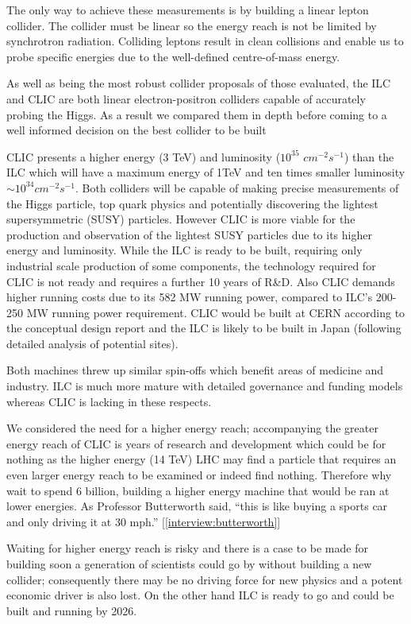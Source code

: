 The only way to achieve these measurements is by building a linear lepton collider. The collider must be linear so the energy reach is not be limited by synchrotron radiation. Colliding leptons result in clean collisions and enable us to probe specific energies due to the well-defined centre-of-mass energy.

As well as being the most robust collider proposals of those evaluated, the ILC and CLIC are both linear electron-positron colliders capable of accurately probing the Higgs. As a result we compared them in depth before coming to a well informed decision on the best collider to be built

CLIC presents a higher energy (3 TeV) and luminosity ($10^{35}$ $cm^{-2} s^{-1}$) than the ILC which will have a maximum energy of 1TeV and ten times smaller luminosity $\sim10^{34} cm^{-2} s^{-1}$. Both colliders will be capable of making precise measurements of the Higgs particle, top quark physics and potentially discovering the lightest supersymmetric (SUSY) particles. However CLIC is more viable for the production and observation of the lightest SUSY particles due to its higher energy and luminosity. While the ILC is ready to be built, requiring only industrial scale production of some components, the technology required for CLIC is not ready and requires a further 10 years of R\&D. Also CLIC demands higher running costs due to its 582 MW running power, compared to ILC's 200-250 MW running power requirement. CLIC would be built at CERN according to the conceptual design report and the ILC is likely to be built in Japan (following detailed analysis of potential sites).  

Both machines threw up similar spin-offs which benefit areas of medicine and industry. ILC is much more mature with detailed governance and funding models whereas CLIC is lacking in these respects.

We considered the need for a higher energy reach; accompanying the greater energy reach of CLIC is years of research and development which could be for nothing as the higher energy (14 TeV) LHC may find a particle that requires an even larger energy reach to be examined or indeed find nothing. Therefore why wait to spend 6 billion, building a higher energy machine that would be ran at lower energies. As Professor Butterworth said, ``this is like buying a sports car and only driving it at 30 mph.'' [\ref{interview:butterworth}]

Waiting for higher energy reach is risky and there is a case to be made for building soon \textendash a generation of scientists could go by without building a new collider; consequently there may be no driving force for new physics and a potent economic driver is also lost. On the other hand ILC is ready to go and could be built and running by 2026.

